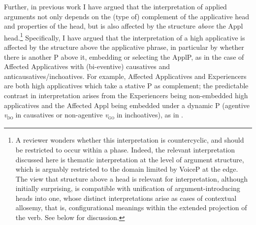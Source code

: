 \documentclass[output=paper,colorlinks,citecolor=brown,modfonts,nonflat]{langsci/langscibook}
\begin{document}
Further, in previous work I have argued that the interpretation of applied arguments not only depends on the (type of) complement of the applicative head and properties of the head, but is also affected by the structure \textit{above} the Appl head.\footnote{A reviewer wonders whether this interpretation is countercyclic, and should be restricted to occur within a phase. Indeed, the relevant interpretation discussed here is thematic interpretation at the level of argument structure, which is arguably restricted to the domain limited by VoiceP at the edge. The view that structure above a head is relevant for interpretation, although initially surprising, is compatible with  unification of argument-introducing heads into one, whose distinct interpretations arise as cases of contextual allosemy, that is, configurational meanings within the extended projection of the verb. See below for discussion.} Specifically, I have argued that the interpretation of a high applicative is affected by the structure above the applicative phrase, in particular by whether there is another {\liv}P above it, embedding or selecting the ApplP, as in the case of Affected Applicatives with (bi-eventive) causatives and anticausatives/inchoatives. For example, Affected Applicatives  and Experiencers  are both high applicatives which take a stative {\liv}P as complement; the predictable contrast in interpretation arises from the Experiencers being non-embedded high applicatives  and the Affected Appl being embedded under a dynamic {\liv}P (agentive \textit{v}\textsc{\textsubscript{do}} in causatives or non-agentive \textit{v}\textsc{\textsubscript{go}} in inchoatives), as in .
\end{document}
